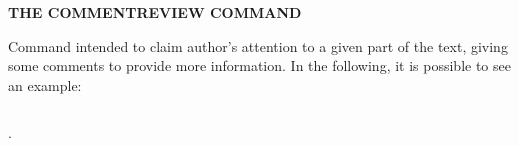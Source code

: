 \textbf{\uppercase {The commentreview command}}

Command intended to claim author's attention to a given part of the text, giving some comments to provide more information. In the following, it is possible to see an example:

\begin{center}
\begin{minipage}[ht]{0.45\textwidth}
\begin{lstlisting}[language=tex]
%*\keyword{$\backslash$commentreview}*){This text will receive a comment.}{This is the comment I have!}.
\end{lstlisting}
\end{minipage}
\hspace{10pt}
\begin{minipage}[ht]{0.45\textwidth}
.
\end{minipage}
\end{center}